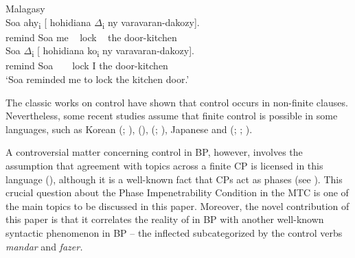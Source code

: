 \documentclass[output=paper]{langsci/langscibook}
\begin{document}
\ea%
    Malagasy \citep[755]{Potsdam2009}\label{ex:moreno:4}\\
    \ea
     Soa  ahy\textsubscript{i} [ hohidiana ${\Delta}$\textsubscript{i}   ny varavaran-dakozy].\\
         remind                 Soa   me   ~ lock ~ the door-kitchen\\
    \ex
     Soa  ${\Delta}$\textsubscript{i}        [ hohidiana ko\textsubscript{i}   ny varavaran-dakozy].\\
         remind                    Soa    ~ ~ lock          I      the door-kitchen\\
    \glt ‘Soa reminded me to lock the kitchen door.’
    \z
\z

\noindent The classic works on control have shown that control occurs in non-finite clauses. Nevertheless, some recent studies assume that finite control is possible in some languages, such as Korean (\citealt{Yang1985}; \citealt{Borer1989}),  (\citealt{Suñer1988}),  (\citealt{Terzi1992,Modesto2000a,Modesto2000b}; \citealt{Alexiadou2010,Alexiadou2011}), Japanese \citep{Uchibori2000} and (\citealt{Farrell1995}; \citealt{Rodrigues2004}; \citealt{Boeckx2006}).

A controversial matter concerning control in BP, however, involves the assumption that agreement with topics across a finite CP is licensed in this language (\citealt{Martins2005}), although it is a well-known fact that CPs act as phases (see \citealt{Chomsky2000}). This crucial question about the Phase Impenetrability Condition in the MTC is one of the main topics to be discussed in this paper. Moreover, the novel contribution of this paper is that it correlates the reality of  in BP with another well-known syntactic phenomenon in BP – the inflected  subcategorized by the control verbs \textit{mandar} and \textit{fazer.}

\end{document}
